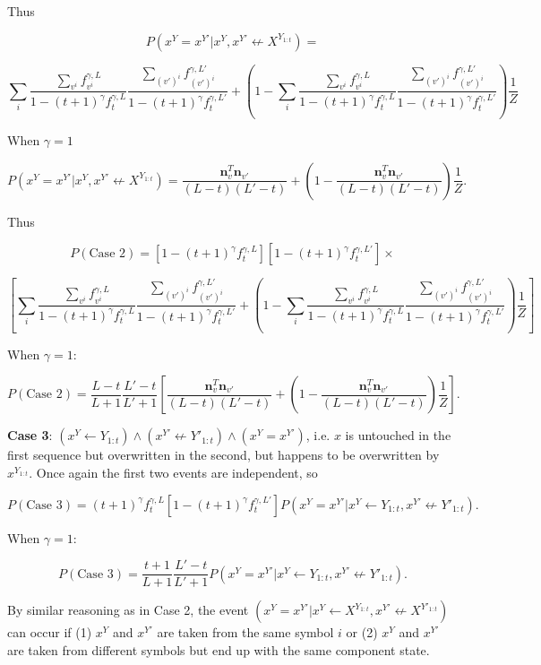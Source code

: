 \documentclass{article}
\begin{document}
\begin{appendices}
Thus

$$P(x^Y = x^{Y'}|x^Y, x^{Y'} \not\leftarrow X^{Y_{1:t}}) = $$

$$\sum_i \frac{\sum\limits_{v^i} f^{\gamma,L}_{v^i}}{1 - (t+1)^\gamma f^{\gamma,L}_t} \frac{\sum\limits_{(v')^i} f^{\gamma,L'}_{(v')^i}}{1 - (t+1)^\gamma f^{\gamma,L'}_t} + \left(1 - \sum_i \frac{\sum\limits_{v^i} f^{\gamma,L}_{v^i}}{1 - (t+1)^\gamma f^{\gamma,L}_t} \frac{\sum\limits_{(v')^i} f^{\gamma,L'}_{(v')^i}}{1 - (t+1)^\gamma f^{\gamma,L'}_t}\right)\frac{1}{Z}$$

When $\gamma = 1$

$$P(x^Y = x^{Y'}|x^Y, x^{Y'} \not\leftarrow X^{Y_{1:t}}) = \frac{\mathbf{n}^T_v\mathbf{n}_{v'}}{(L-t)(L'-t)} + \left(1 - \frac{\mathbf{n}^T_v\mathbf{n}_{v'}}{(L-t)(L'-t)} \right)\frac{1}{Z}.$$

Thus

$$P(\textrm{Case 2}) = [1 - (t+1)^\gamma f^{\gamma,L}_t][1 - (t+1)^\gamma f^{\gamma,L'}_t] \times$$

$$\left[
\sum_i \frac{\sum\limits_{v^i} f^{\gamma,L}_{v^i}}{1 - (t+1)^\gamma f^{\gamma,L}_t} \frac{\sum\limits_{(v')^i} f^{\gamma,L'}_{(v')^i}}{1 - (t+1)^\gamma f^{\gamma,L'}_t} + \left(1 - \sum_i \frac{\sum\limits_{v^i} f^{\gamma,L}_{v^i}}{1 - (t+1)^\gamma f^{\gamma,L}_t} \frac{\sum\limits_{(v')^i} f^{\gamma,L'}_{(v')^i}}{1 - (t+1)^\gamma f^{\gamma,L'}_t}\right)\frac{1}{Z}
\right]$$

When $\gamma = 1$:

$$P(\textrm{Case 2}) = \frac{L-t}{L+1}\frac{L'-t}{L'+1}\left[\frac{\mathbf{n}^T_v\mathbf{n}_{v'}}{(L-t)(L'-t)} + \left(1 - \frac{\mathbf{n}^T_v\mathbf{n}_{v'}}{(L-t)(L'-t)} \right)\frac{1}{Z}\right].$$

\textbf{Case 3}: $(x^Y \leftarrow Y_{1:t}) \land (x^{Y'} \not\leftarrow Y'_{1:t}) \land (x^Y = x^{Y'})$, i.e. $x$ is untouched in the first sequence but overwritten in the second, but happens to be overwritten by $x^{Y_{1:t}}$. Once again the first two events are independent, so 

$$P(\textrm{Case 3}) = (t+1)^\gamma f^{\gamma,L}_t[1-(t+1)^\gamma f^{\gamma,L'}_t]P(x^Y = x^{Y'}|x^Y \leftarrow Y_{1:t}, x^{Y'} \not\leftarrow Y'_{1:t}).$$

When $\gamma = 1$:

$$P(\textrm{Case 3}) = \frac{t+1}{L+1}\frac{L'-t}{L'+1}P(x^Y = x^{Y'}|x^Y \leftarrow Y_{1:t}, x^{Y'} \not\leftarrow Y'_{1:t}).$$

By similar reasoning as in Case 2, the event $(x^Y = x^{Y'}|x^Y \leftarrow X^{Y_{1:t}}, x^{Y'} \not\leftarrow X^{Y'_{1:t}})$ can occur if (1) $x^Y$ and $x^{Y'}$ are taken from the same symbol $i$ or (2) $x^Y$ and $x^{Y'}$ are taken from different symbols but end up with the same component state.


\end{appendices}
\end{document}
